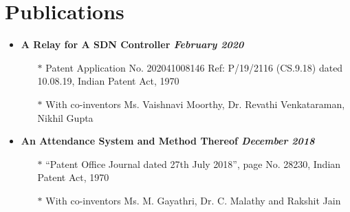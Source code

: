 \documentclass[10pt,a4paper]{article}
\begin{document}
\section{{\faNewspaperO} Publications}
	\begin{itemize}[noitemsep,nolistsep]
		\item\textbf{A Relay for A SDN Controller \hfill \textit{February 2020}}
			\begin{itemize}[leftmargin=*]
				\setlength\itemsep{-0.25em}
				\item[$\ast$]Patent Application No. 202041008146 Ref: P/19/2116 (CS.9.18) dated 10.08.19, Indian Patent Act, 1970
				\item[$\ast$]With co-inventors Ms. Vaishnavi Moorthy, Dr. Revathi Venkataraman, Nikhil Gupta
			\end{itemize}
		\item\textbf{An Attendance System and Method Thereof \hfill \textit{December 2018}}
			\begin{itemize}[leftmargin=*]
				\setlength\itemsep{-0.25em}
				\item[$\ast$]``Patent Office Journal dated 27th July 2018'', page No. 28230, Indian Patent Act, 1970
				\item[$\ast$]With co-inventors Ms. M. Gayathri, Dr. C. Malathy and Rakshit Jain
			\end{itemize}
	\end{itemize}
\end{document}
